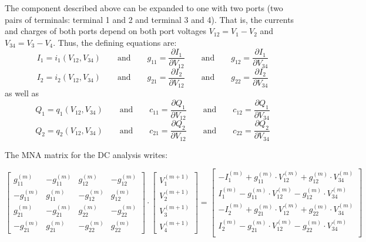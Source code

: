 The component described above can be expanded to one with two ports
(two pairs of terminals: terminal 1 and 2 and terminal 3 and 4).
That is, the currents and charges of both ports depend on both
port voltages $V_{12}=V_1-V_2$ and $V_{34}=V_3-V_4$. Thus, the defining equations are:
\begin{equation}
I_1 = i_1(V_{12}, V_{34}) \qquad\text{and}\qquad
g_{11} = \dfrac{\partial I_1}{\partial V_{12}} \qquad\text{and}\qquad
g_{12} = \dfrac{\partial I_1}{\partial V_{34}}
\end{equation}
\begin{equation}
I_2 = i_2(V_{12}, V_{34}) \qquad\text{and}\qquad
g_{21} = \dfrac{\partial I_2}{\partial V_{12}} \qquad\text{and}\qquad
g_{22} = \dfrac{\partial I_2}{\partial V_{34}}
\end{equation}
as well as
\begin{equation}
Q_1 = q_1(V_{12}, V_{34}) \qquad\text{and}\qquad
c_{11} = \dfrac{\partial Q_1}{\partial V_{12}} \qquad\text{and}\qquad
c_{12} = \dfrac{\partial Q_1}{\partial V_{34}}
\end{equation}
\begin{equation}
Q_2 = q_2(V_{12}, V_{34}) \qquad\text{and}\qquad
c_{21} = \dfrac{\partial Q_2}{\partial V_{12}} \qquad\text{and}\qquad
c_{22} = \dfrac{\partial Q_2}{\partial V_{34}}
\end{equation}

The MNA matrix for the DC analysis writes:

\begin{equation}
\begin{bmatrix}
 g_{11}^{(m)} & -g_{11}^{(m)} &  g_{12}^{(m)} & -g_{12}^{(m)}\\
-g_{11}^{(m)} &  g_{11}^{(m)} & -g_{12}^{(m)} &  g_{12}^{(m)}\\
 g_{21}^{(m)} & -g_{21}^{(m)} &  g_{22}^{(m)} & -g_{22}^{(m)}\\
-g_{21}^{(m)} &  g_{21}^{(m)} & -g_{22}^{(m)} &  g_{22}^{(m)}
\end{bmatrix}
\cdot
\begin{bmatrix}
V_{1}^{(m+1)}\\
V_{2}^{(m+1)}\\
V_{3}^{(m+1)}\\
V_{4}^{(m+1)}
\end{bmatrix}
=
\begin{bmatrix}
-I_1^{(m)} + g_{11}^{(m)}\cdot V_{12}^{(m)} + g_{12}^{(m)}\cdot V_{34}^{(m)}\\
 I_1^{(m)} - g_{11}^{(m)}\cdot V_{12}^{(m)} - g_{12}^{(m)}\cdot V_{34}^{(m)}\\
-I_2^{(m)} + g_{21}^{(m)}\cdot V_{12}^{(m)} + g_{22}^{(m)}\cdot V_{34}^{(m)}\\
 I_2^{(m)} - g_{21}^{(m)}\cdot V_{12}^{(m)} - g_{22}^{(m)}\cdot V_{34}^{(m)}\\
\end{bmatrix}
\end{equation}

